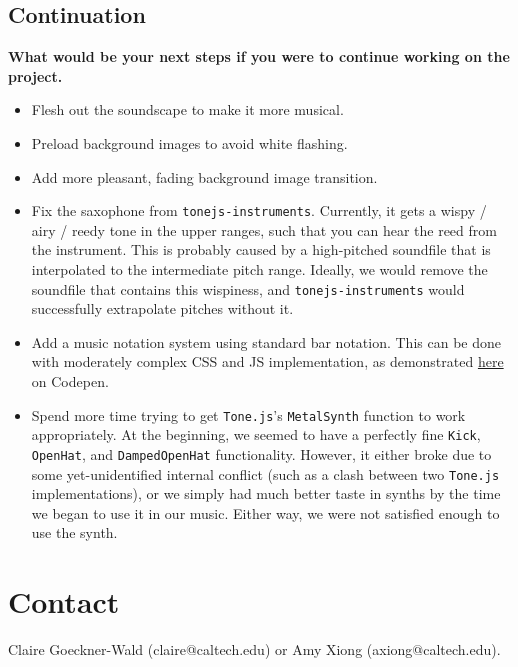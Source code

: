 \documentclass[12pt,a4paper]{article}
\newcommand{\code}{\texttt}
\newcommand{\lightcode}[1]{\colorbox{light-gray}{\texttt{#1}}}
\begin{document}
\subsection{Continuation}
\textbf{What would be your next steps if you were to continue working on the project.}
\begin{itemize}
	\item Flesh out the soundscape to make it more musical.
	\item Preload background images to avoid white flashing.
	\item Add more pleasant, fading background image transition.
	\item Fix the saxophone from \lightcode{tonejs-instruments}. Currently, it gets a wispy / airy / reedy tone in the upper ranges, such that you can hear the reed from the instrument. This is probably caused by a high-pitched soundfile that is interpolated to the intermediate pitch range. Ideally, we would remove the soundfile that contains this wispiness, and \lightcode{tonejs-instruments} would successfully extrapolate pitches without it.
	\item Add a music notation system using standard bar notation. This can be done with moderately complex CSS and JS implementation, as demonstrated \href{https://codepen.io/laviperchik/pen/mIACq}{here} on Codepen. \cite{css-musical-notes}
	\item Spend more time trying to get \lightcode{Tone.js}'s \code{MetalSynth} function to work appropriately. At the beginning, we seemed to have a perfectly fine \code{Kick}, \code{OpenHat}, and \code{DampedOpenHat} functionality. However, it either broke due to some yet-unidentified internal conflict (such as a clash between two \lightcode{Tone.js} implementations), or we simply had much better taste in synths by the time we began to use it in our music. Either way, we were not satisfied enough to use the synth. 
\end{itemize}


\section{Contact}

Claire Goeckner-Wald (claire@caltech.edu) or Amy Xiong (axiong@caltech.edu).

\end{document}
